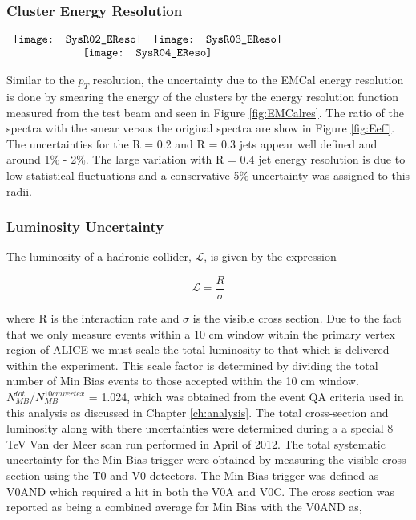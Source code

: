 \subsubsection{Cluster Energy Resolution}

\begin{figure*}[t!]
$\begin{array}{rl}
    \texttt{[image: SysR02\_EReso]} &
    \texttt{[image: SysR03\_EReso]}\\
    \multicolumn{2}{c}{\texttt{[image: SysR04\_EReso]}}
\end{array}$
\caption[Systematic due to energy resolution.]{\label{fig:Eeff}Systematic due to the energy resolution; R = 0.2 \textit{(top left)}, R = 0.3 \textit{(top right)}, R = 0.4 \textit{(bottom)}.}
\end{figure*}

Similar to the $p_{T}$ resolution, the uncertainty due to the EMCal energy resolution is done by smearing the energy of the clusters by the energy resolution function measured from the test beam and seen in Figure \ref{fig:EMCalres}.  The ratio of the spectra with the smear versus the original spectra are show in Figure \ref{fig:Eeff}. The uncertainties for the R = 0.2 and R = 0.3 jets appear well defined and around 1\% - 2\%.  The large variation with R = 0.4 jet energy resolution is due to low statistical fluctuations and a conservative 5\% uncertainty was assigned to this radii.

\subsubsection{Luminosity Uncertainty}

The luminosity of a hadronic collider, $\mathscr{L}$, is given by the expression



\begin{equation}
\mathscr{L} = \frac{R}{\sigma}
\label{eq:xlumdef}
\end{equation}

\noindent
where R is the interaction rate and $\sigma$ is the visible cross section.  Due to the fact that we only measure events within a 10 cm window within the primary vertex region of ALICE we must scale the total luminosity to that which is delivered within the experiment.  This scale factor is determined by dividing the total number of Min Bias events to those accepted within the 10 cm window.  $N^{tot}_{MB} / N^{10 cm vertex}_{MB}$ = 1.024, which was obtained from the event QA criteria used in this analysis as discussed in Chapter \ref{ch:analysis}.
The total cross-section and luminosity along with there uncertainties were determined during a a special 8 TeV Van der Meer scan run performed in April of 2012\cite{ALICE-PUBLIC-2017-002}.  The total systematic uncertainty for the Min Bias trigger were obtained by measuring the visible cross-section using the T0 and V0 detectors.  The Min Bias trigger was defined as V0AND which required a hit in both the V0A and V0C.  The cross section was reported as being a combined average for Min Bias with the V0AND as, 

